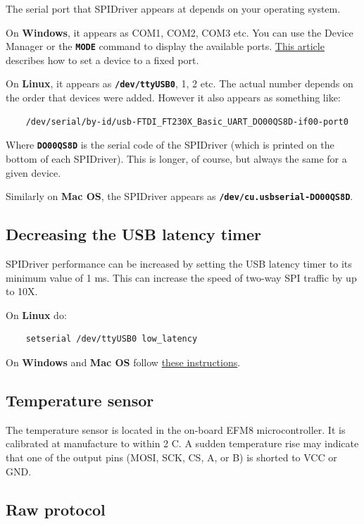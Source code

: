 \documentclass{article}
\newcommand{\mach}[1]{\texttt{\textbf{#1}}}
\begin{document}
The serial port that SPIDriver appears at depends on your operating system.

On \textbf{Windows}, it appears as COM1, COM2, COM3 etc.
You can use the Device Manager or the \mach{MODE} command to display the available ports.
\href{https://plugable.com/2011/07/04/how-to-change-the-com-port-for-a-usb-serial-adapter-on-windows-7/}{This article}
describes how to set a device to a fixed port.

On \textbf{Linux}, it appears as \mach{/dev/ttyUSB0}, 1, 2 etc.
The actual number depends on the order that devices were added.
However it also appears as something like:
\begin{lstlisting}
    /dev/serial/by-id/usb-FTDI_FT230X_Basic_UART_DO00QS8D-if00-port0
\end{lstlisting}
Where \mach{DO00QS8D} is the serial code of the SPIDriver (which is printed on the bottom of each SPIDriver).
This is longer, of course, but always the same for a given device.

Similarly on \textbf{Mac OS}, the SPIDriver appears as \mach{/dev/cu.usbserial-DO00QS8D}.

\subsection{Decreasing the USB latency timer}

SPIDriver performance can be increased by setting the USB latency timer to its minimum value of 1 ms.
This can increase the speed of two-way SPI traffic by up to 10X.

On \textbf{Linux} do:

\begin{lstlisting}
    setserial /dev/ttyUSB0 low_latency
\end{lstlisting}

On \textbf{Windows} and \textbf{Mac OS} follow
\href{https://projectgus.com/2011/10/notes-on-ftdi-latency-with-arduino/}{these instructions}.

\subsection{Temperature sensor}

The temperature sensor is located in the on-board EFM8 microcontroller.
It is calibrated at manufacture to within 2 C.
A sudden temperature rise may indicate that one of the output pins (MOSI, SCK, CS, A, or B) is shorted to VCC or GND.

\subsection{Raw protocol}
\end{document}
